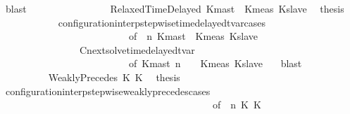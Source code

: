 \begin{isabellebody}
\ blast\isanewline
\ \ \ \ \ \ \isamarkupfalse%
\isanewline
\ \ \ \ \ \ \ \ \isamarkupfalse%
\ {\isacharparenleft}RelaxedTimeDelayed\ Kmast\ {\isasymtau}\ Kmeas\ Kslave{\isacharparenright}\ \isamarkupfalse%
\ {\isacharquery}thesis\isanewline
\ \ \ \ \ \ \ \ \ \ \isamarkupfalse%
\ configuration{\isacharunderscore}interp{\isacharunderscore}stepwise{\isacharunderscore}timedelayed{\isacharunderscore}tvar{\isacharunderscore}cases\isanewline
\ \ \ \ \ \ \ \ \ \ \ \ \ \ \ \ \ \ \ \ \ \ \ \ \ \ {\isacharbrackleft}of\ {\isacartoucheopen}{\isasymGamma}{\isacartoucheclose}\ {\isacartoucheopen}n{\isacartoucheclose}\ {\isacartoucheopen}Kmast{\isacartoucheclose}\ {\isacartoucheopen}{\isasymtau}{\isacartoucheclose}\ {\isacartoucheopen}Kmeas{\isacartoucheclose}\ {\isacartoucheopen}Kslave{\isacartoucheclose}\ {\isacartoucheopen}{\isasymPsi}{\isacartoucheclose}\ {\isacartoucheopen}{\isasymPhi}{\isacartoucheclose}{\isacharbrackright}\isanewline
\ \ \ \ \ \ \ \ \ \ \ \ \ \ \ \ Cnext{\isacharunderscore}solve{\isacharunderscore}timedelayed{\isacharunderscore}tvar\isanewline
\ \ \ \ \ \ \ \ \ \ \ \ \ \ \ \ \ \ \ \ \ \ \ \ \ \ {\isacharbrackleft}of\ {\isacartoucheopen}Kmast{\isacartoucheclose}\ {\isacartoucheopen}n{\isacartoucheclose}\ {\isacartoucheopen}{\isasymGamma}{\isacartoucheclose}\ {\isacartoucheopen}{\isasymPsi}{\isacartoucheclose}\ {\isacartoucheopen}{\isasymtau}{\isacartoucheclose}\ {\isacartoucheopen}Kmeas{\isacartoucheclose}\ {\isacartoucheopen}Kslave{\isacartoucheclose}\ {\isacartoucheopen}{\isasymPhi}{\isacartoucheclose}{\isacharbrackright}\ \isamarkupfalse%
\ blast\isanewline
\ \ \ \ \ \ \isamarkupfalse%
\isanewline
\ \ \ \ \ \ \ \ \isamarkupfalse%
\ {\isacharparenleft}WeaklyPrecedes\ K{}\ K{}{\isacharparenright}\ \isamarkupfalse%
\ {\isacharquery}thesis\isanewline
\ \ \ \ \ \ \ \ \ \ \isamarkupfalse%
\ configuration{\isacharunderscore}interp{\isacharunderscore}stepwise{\isacharunderscore}weakly{\isacharunderscore}precedes{\isacharunderscore}cases\isanewline
\ \ \ \ \ \ \ \ \ \ \ \ \ \ \ \ \ \ \ \ \ \ \ \ \ \ \ \ \ \ \ \ \ \ \ \ \ \ \ \ \ \ \ {\isacharbrackleft}of\ {\isacartoucheopen}{\isasymGamma}{\isacartoucheclose}\ {\isacartoucheopen}n{\isacartoucheclose}\ {\isacartoucheopen}K{}{\isacartoucheclose}\ {\isacartoucheopen}K{}{\isacartoucheclose}\ {\isacartoucheopen}{\isasymPsi}{\isacartoucheclose}\ {\isacartoucheopen}{\isasymPhi}{\isacartoucheclose}{\isacharbrackright}\isanewline

\end{isabellebody}
